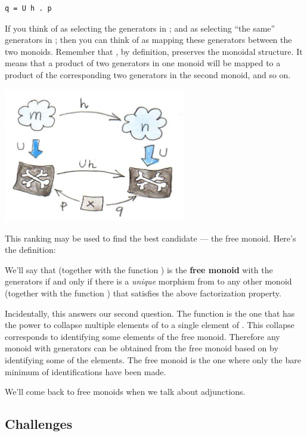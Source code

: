 \begin{verbatim}
q = U h . p
\end{verbatim}

If you think of  as selecting the generators in ;
and  as selecting ``the same'' generators in ; then
you can think of  as mapping these generators between the two
monoids. Remember that , by definition, preserves the monoidal
structure. It means that a product of two generators in one monoid will
be mapped to a product of the corresponding two generators in the second
monoid, and so on.

\includegraphics[width=3.12500in]{images/monoid-ranking.jpg}

This ranking may be used to find the best candidate --- the free monoid.
Here's the definition:

We'll say that  (together with the function ) is the
\textbf{free monoid} with the generators  if and only if there
is a \emph{unique} morphism  from  to any other
monoid  (together with the function ) that satisfies
the above factorization property.

Incidentally, this answers our second question. The function
 is the one that has the power to collapse multiple
elements of  to a single element of . This
collapse corresponds to identifying some elements of the free monoid.
Therefore any monoid with generators  can be obtained from the
free monoid based on  by identifying some of the elements. The
free monoid is the one where only the bare minimum of identifications
have been made.

We'll come back to free monoids when we talk about adjunctions.

\subsection{Challenges}\label{challenges}

